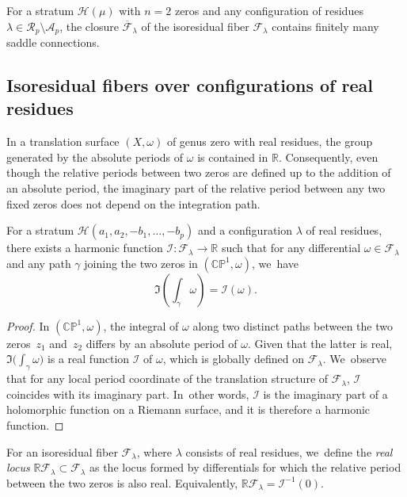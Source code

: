 \begin{cor}\label{cor:SCFinite}
For a stratum $\mathcal{H}(\mu)$ with $n=2$ zeros and any configuration of residues $\lambda \in \mathcal{R}_{p} \setminus \mathcal{A}_{p}$, the closure $\overline{\mathcal{F}}_{\lambda}$ of the isoresidual fiber $\mathcal{F}_{\lambda}$ contains finitely many saddle connections.
\end{cor}

\subsection{Isoresidual fibers over configurations of real residues}\label{sub:FiberReal}

In a translation surface $(X,\omega)$ of genus zero with real residues, the group generated by the absolute periods of $\omega$ is contained in $\mathbb{R}$. Consequently, even though the relative periods between two zeros are defined up to the addition of an absolute period, the imaginary part of the relative period between any two fixed zeros does not depend on the integration path.

\begin{lem}\label{lem:Imaginary}
For a stratum $\mathcal{H}(a_{1},a_{2},-b_{1},\dots,-b_{p})$ and a configuration $\lambda$ of real residues, there exists a harmonic function $\mathcal{I}\colon\mathcal{F}_{\lambda} \to \mathbb{R}$ such that for any differential $\omega \in \mathcal{F}_{\lambda}$ and any path $\gamma$ joining the two zeros in $(\mathbb{CP}^{1},\omega)$, we~have
\[
\Im \left( \int_{\gamma} \omega \right) = \mathcal{I}(\omega).
\]
\end{lem}

\begin{proof}
In $(\mathbb{CP}^{1},\omega)$, the integral of $\omega$ along two distinct paths between the two zeros~$z_{1}$ and~$z_{2}$ differs by an absolute period of $\omega$. Given that the latter is real, $\Im\big(\int_{\gamma} \omega\big)$ is a real function $\mathcal{I}$ of $\omega$, which is globally defined on $\mathcal F_\lambda$. We~observe that for any local period coordinate of the translation structure of $\mathcal{F}_{\lambda}$, $\mathcal{I}$ coincides with its imaginary part. In~other words, $\mathcal{I}$ is the imaginary part of a holomorphic function on a Riemann surface, and it is therefore a harmonic function.
\end{proof}

For an isoresidual fiber $\mathcal{F}_{\lambda}$, where $\lambda$ consists of real residues, we~define the \textit{real locus} $\mathbb{R}\mathcal{F}_{\lambda} \subset \mathcal{F}_{\lambda}$ as the locus formed by differentials for which the relative period between the two zeros is also real. Equivalently, $\mathbb{R}\mathcal{F}_{\lambda} = \mathcal{I}^{-1}(0)$.

